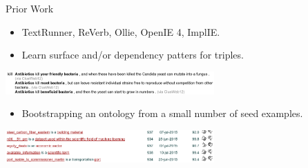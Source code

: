 \def\title{Prior Work}
\begin{frame}{\title}

\begin{itemize}
  \item TextRunner, ReVerb, Ollie, OpenIE 4, ImplIE.
  \item Learn surface and/or dependency patters for triples.
\end{itemize}
\begin{center}
  \includegraphics[width=8cm]{../../img/openie-facts.png} \\
\end{center}
\pause

\begin{itemize}
  \item Bootstrapping an ontology from a small number of seed examples.
\end{itemize}
\begin{center}
  \includegraphics[width=8cm]{../../img/nell-facts.png} \\
\end{center}
\pause

\end{frame}


